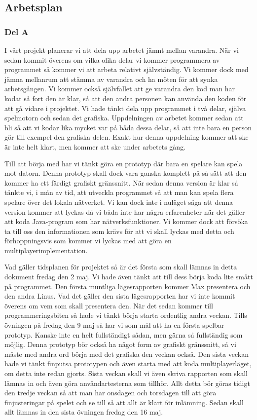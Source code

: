 \documentclass[10pt,a4paper]{article}
\begin{document}
\subsection*{Arbetsplan}

\subsubsection*{Del A}

I vårt projekt planerar vi att dela upp arbetet jämnt mellan varandra. När
vi sedan kommit överens om vilka olika delar vi kommer programmera av
programmet så kommer vi att arbeta relativt självständig. Vi kommer dock
med jämna mellanrum att stämma av varandra och ha möten för att synka
arbetsgången. Vi kommer också självfallet att ge varandra den kod man har
kodat så fort den är klar, så att den andra personen kan använda den koden
för att gå vidare i projektet. Vi hade tänkt dela upp programmet i två
delar, själva spelmotorn och sedan det grafiska. Uppdelningen av arbetet
kommer sedan att bli så att vi kodar lika mycket var på båda dessa delar,
så att inte bara en person gör till exempel den grafiska delen. Exakt hur
denna uppdelning kommer att ske är inte helt klart, men kommer att ske
under arbetets gång.

Till att börja med har vi tänkt göra en prototyp där bara en spelare kan
spela mot datorn. Denna prototyp skall dock vara ganska komplett på så sätt
att den kommer ha ett färdigt grafiskt gränssnitt. När sedan denna version
är klar så tänkte vi, i mån av tid, att utveckla programmet så att man kan
spela flera spelare över det lokala nätverket. Vi kan dock inte i nuläget
säga att denna version kommer att lyckas då vi båda inte har några
erfarenheter när det gäller att koda Java-program som har
nätverksfunktioner. Vi kommer dock att försöka ta till oss den
informationen som krävs för att vi skall lyckas med detta och
förhoppningsvis som kommer vi lyckas med att göra en
multiplayerimplementation.

Vad gäller tidsplanen för projektet så är det första som skall lämnas in
detta dokument fredag den 2 maj. Vi hade även tänkt att till dess börja
koda lite smått på programmet. Den första muntliga lägesrapporten kommer
Max presentera och den andra Linus. Vad det gäller den sista lägesrapporten
har vi inte kommit överens om vem som skall presentera den. När det sedan
kommer till programmeringsbiten så hade vi tänkt börja starta ordentlig
andra veckan. Tills övningen på fredag den 9 maj så har vi som mål att ha
en första spelbar prototyp. Kanske inte en helt fullständigt sådan, men
gärna så fullständig som möjlig. Denna prototyp bör också ha något form av
grafiskt gränssnitt, så vi måste med andra ord börja med det grafiska den
veckan också. Den sista veckan hade vi tänkt finputsa prototypen och även
starta med att koda multiplayerläget, om detta inte redan gjorts. Sista
veckan skall vi även skriva rapporten som skall lämnas in och även göra
användartesterna som tillhör. Allt detta bör göras tidigt den tredje veckan
så att man har onsdagen och torsdagen till att göra finjusteringar på
spelet och se till så att allt är klart för inlämning. Sedan skall allt
lämnas in den sista övningen fredag den 16 maj.
\end{document}
